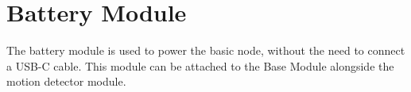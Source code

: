 \section{Battery Module} 

The battery module is used to power the basic node, without the need
to connect a USB-C cable. This module can be attached to the Base Module 
alongside the motion detector module. 



